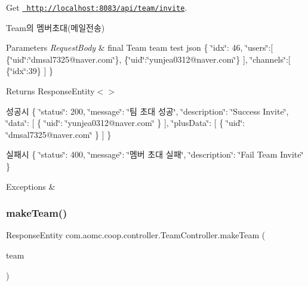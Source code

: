 Get \href{http://localhost:8083/api/team/invite}{\texttt{ http\+://localhost\+:8083/api/team/invite}}. 

Team의 멤버초대(메일전송)


\begin{DoxyParams}{Parameters}
{\em Request\+Body} & final Team team test json \{ \char`\"{}idx\char`\"{}\+: 46, \char`\"{}users\char`\"{}\+:\mbox{[} \{\char`\"{}uid\char`\"{}\+:\char`\"{}dmsal7325@naver.\+com\char`\"{}\}, \{\char`\"{}uid\char`\"{}\+:\char`\"{}yunjea0312@naver.\+com\char`\"{}\} \mbox{]}, \char`\"{}channels\char`\"{}\+:\mbox{[} \{\char`\"{}idx\char`\"{}\+:39\} \mbox{]} \}\\
\hline
\end{DoxyParams}
\begin{DoxyReturn}{Returns}
Response\+Entity$<$$>$
\end{DoxyReturn}
성공시 \{ \char`\"{}status\char`\"{}\+: 200, \char`\"{}message\char`\"{}\+: \char`\"{}팀 초대 성공\char`\"{}, \char`\"{}description\char`\"{}\+: \char`\"{}\+Success Invite\char`\"{}, \char`\"{}data\char`\"{}\+: \mbox{[} \{ \char`\"{}uid\char`\"{}\+: \char`\"{}yunjea0312@naver.\+com\char`\"{} \} \mbox{]}, \char`\"{}plus\+Data\char`\"{}\+: \mbox{[} \{ \char`\"{}uid\char`\"{}\+: \char`\"{}dmsal7325@naver.\+com\char`\"{} \} \mbox{]} \}

실패시 \{ \char`\"{}status\char`\"{}\+: 400, \char`\"{}message\char`\"{}\+: \char`\"{}멤버 초대 실패\char`\"{}, \char`\"{}description\char`\"{}\+: \char`\"{}\+Fail Team Invite\char`\"{} \}


\begin{DoxyExceptions}{Exceptions}
{\em } & \\
\hline
\end{DoxyExceptions}
\mbox{\label{classcom_1_1aomc_1_1coop_1_1controller_1_1_team_controller_a5ffe7bc4c7dd609d828848bae014440f}} 
\subsubsection{\texorpdfstring{makeTeam()}{makeTeam()}}
{\footnotesize\ttfamily Response\+Entity com.\+aomc.\+coop.\+controller.\+Team\+Controller.\+make\+Team (\begin{DoxyParamCaption}\item[{@Request\+Body final Team}]{team }\end{DoxyParamCaption})}




